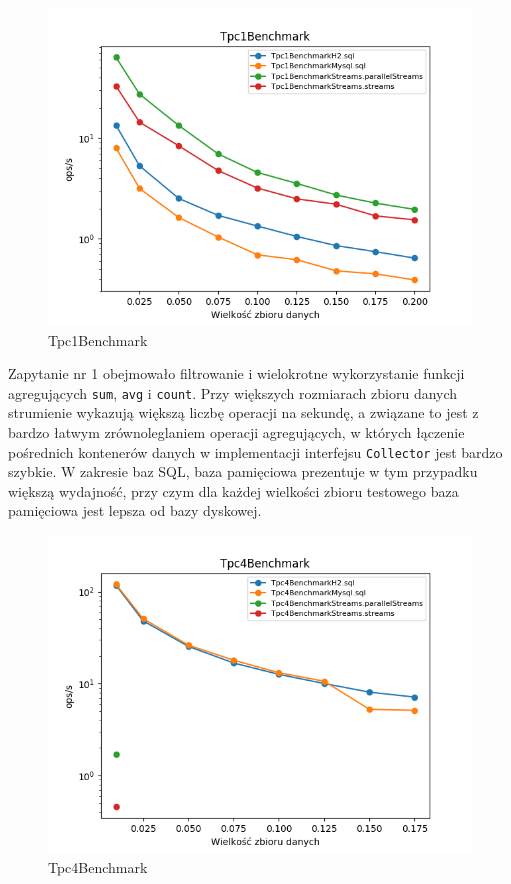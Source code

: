 \documentclass[12pt,twoside,openright]{extarticle}
\begin{document}
\begin{figure}[h]
\centering
\includegraphics[width=15cm]{plots/Tpc1Benchmark}
\caption{Tpc1Benchmark}
\end{figure}

    Zapytanie nr 1 obejmowało filtrowanie i wielokrotne wykorzystanie funkcji agregujących \texttt{sum}, \texttt{avg} i \texttt{count}. Przy większych rozmiarach zbioru danych strumienie wykazują większą liczbę operacji na sekundę, a związane to jest z bardzo łatwym zrównoleglaniem operacji agregujących, w których łączenie pośrednich kontenerów danych w implementacji interfejsu \texttt{Collector} jest bardzo szybkie. W zakresie baz SQL, baza pamięciowa prezentuje w tym przypadku większą wydajność, przy czym dla każdej wielkości zbioru testowego baza pamięciowa jest lepsza od bazy dyskowej. 

\newpage
\begin{figure}[H]
\centering
\includegraphics[width=15cm]{plots/Tpc4Benchmark}
\caption{Tpc4Benchmark}
\end{figure}
\end{document}
